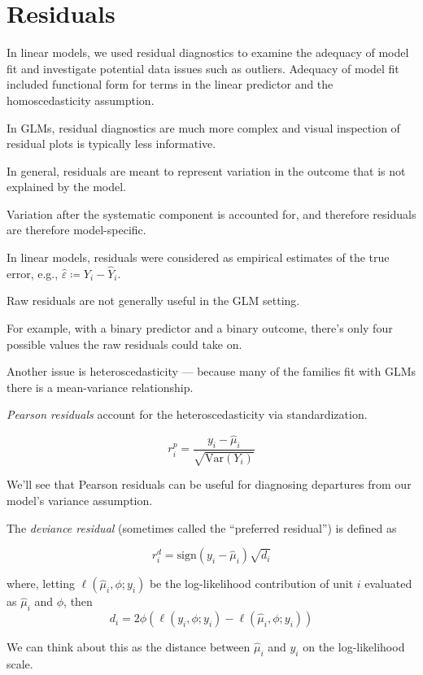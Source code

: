 \documentclass[
  letterpaper,
  DIV=11,
  numbers=noendperiod]{scrreport}
\begin{document}

\hypertarget{residuals}{%
\chapter{Residuals}\label{residuals}}

In linear models, we used residual diagnostics to examine the adequacy
of model fit and investigate potential data issues such as outliers.
Adequacy of model fit included functional form for terms in the linear
predictor and the homoscedasticity assumption.

In GLMs, residual diagnostics are much more complex and visual
inspection of residual plots is typically less informative.

In general, residuals are meant to represent variation in the outcome
that is not explained by the model.

Variation after the systematic component is accounted for, and therefore
residuals are therefore model-specific.

In linear models, residuals were considered as empirical estimates of
the true error, e.g., \(\hat \varepsilon \coloneqq Y_i - \hat Y_i\).

Raw residuals are not generally useful in the GLM setting.

For example, with a binary predictor and a binary outcome, there's only
four possible values the raw residuals could take on.

Another issue is heteroscedasticity --- because many of the families fit
with GLMs there is a mean-variance relationship.

\emph{Pearson residuals} account for the heteroscedasticity via
standardization.

\[r_i^p = \frac{y_i - \hat \mu_i}{\sqrt{\text{Var}(Y_i)}}\]

We'll see that Pearson residuals can be useful for diagnosing departures
from our model's variance assumption.

The \emph{deviance residual} (sometimes called the ``preferred
residual'') is defined as

\[r_i^d = \text{sign}(y_i - \hat \mu_i)\sqrt{d_i}\]

where, letting \(\ell(\hat \mu_i, \phi; y_i)\) be the log-likelihood
contribution of unit \(i\) evaluated as \(\hat \mu_i\) and \(\phi\),
then
\[d_i = 2 \phi(\ell(y_i, \phi; y_i) - \ell(\hat \mu_i, \phi; y_i))\]

We can think about this as the distance between \(\hat \mu_i\) and
\(y_i\) on the log-likelihood scale.
\end{document}
